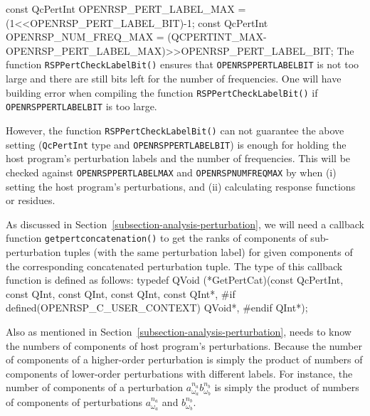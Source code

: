 const QcPertInt OPENRSP_PERT_LABEL_MAX = (1<<OPENRSP_PERT_LABEL_BIT)-1;
const QcPertInt OPENRSP_NUM_FREQ_MAX =
                (QCPERTINT_MAX-OPENRSP_PERT_LABEL_MAX)>>OPENRSP_PERT_LABEL_BIT;
\nwendcode{}The function {\tt{}RSPPertCheckLabelBit()} ensures that
{\tt{}OPENRSP{}PERT{}LABEL{}BIT} is not too large and there are still bits left for
the number of frequencies. One will have building error when compiling the
function {\tt{}RSPPertCheckLabelBit()} if {\tt{}OPENRSP{}PERT{}LABEL{}BIT} is too large.

However, the function {\tt{}RSPPertCheckLabelBit()} can not guarantee the above
setting ({\tt{}QcPertInt} type and {\tt{}OPENRSP{}PERT{}LABEL{}BIT}) is enough for
holding the host program's perturbation labels and the number of frequencies.
This will be checked against {\tt{}OPENRSP{}PERT{}LABEL{}MAX} and
{\tt{}OPENRSP{}NUM{}FREQ{}MAX} by \LibName when (i) setting the host program's
perturbations, and (ii) calculating response functions or residues.

As discussed in Section~\ref{subsection-analysis-perturbation}, we will need a
callback function {\tt{}get{}pert{}concatenation()} to get the ranks of components
of sub-perturbation tuples (with the same perturbation label) for given
components of the corresponding concatenated perturbation tuple. The type of
this callback function is defined as follows:
\nwenddocs{}\endmoddef
typedef QVoid (*GetPertCat)(const QcPertInt,
                            const QInt,
                            const QInt,
                            const QInt,
                            const QInt*,
#if defined(OPENRSP_C_USER_CONTEXT)
                            QVoid*,
#endif
                            QInt*);
\nwendcode{}\nwdocspar

Also as mentioned in Section~\ref{subsection-analysis-perturbation}, \LibName
needs to know the numbers of components of host program's perturbations.
Because the number of components of a higher-order perturbation is simply the
product of numbers of components of lower-order perturbations with different
labels. For instance, the number of components of a perturbation
$a_{\omega_{a}}^{n_{a}}b_{\omega_{b}}^{n_{b}}$ is simply the product of numbers
of components of perturbations $a_{\omega_{a}}^{n_{a}}$ and
$b_{\omega_{b}}^{n_{b}}$.

